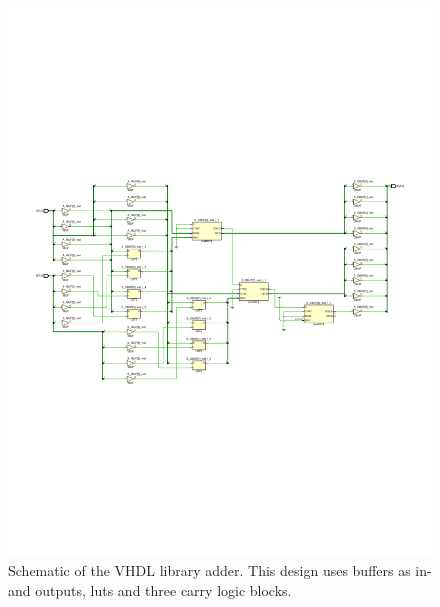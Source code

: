 \begin{figure}[h]
	\centering
	\includegraphics[width=\linewidth, trim=0mm 90mm 0mm 90mm]{./L1/E6/schematic.pdf}
	\caption{Schematic of the VHDL library adder. This design uses buffers as in- and outputs, \glspl{lut} and three carry logic blocks.}
	\label{fig: VHDL library adder}
\end{figure}

